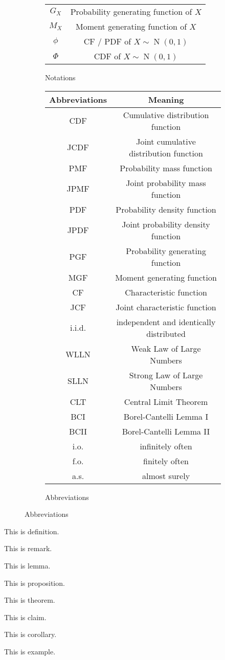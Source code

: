 \documentclass{huhtakm-template-book}
\DeclareMathOperator{\N}{N}
\begin{document}
\begin{figure}[h]
\begin{subfigure}{0.45\textwidth}
\begin{tabular}{cc}
			$G_{X}$ & Probability generating function of $X$\\
			$M_{X}$ & Moment generating function of $X$\\
			$\phi$ & CF / PDF of $X\sim\N(0,1)$\\
			$\Phi$ & CDF of $X\sim\N(0,1)$
		\end{tabular}
		\caption{Notations}
	\end{subfigure}
	\begin{subfigure}{0.45\textwidth}
		\centering
		\begin{tabular}{cc}
			Abbreviations & Meaning\\
			\hline
			CDF & Cumulative distribution function\\
			JCDF & Joint cumulative distribution function\\
			PMF & Probability mass function\\
			JPMF & Joint probability mass function\\
			PDF & Probability density function\\
			JPDF & Joint probability density function\\
			PGF & Probability generating function\\
			MGF & Moment generating function\\
			CF & Characteristic function\\
			JCF & Joint characteristic function\\
			i.i.d. & independent and identically distributed\\
			WLLN & Weak Law of Large Numbers\\
			SLLN & Strong Law of Large Numbers\\
			CLT & Central Limit Theorem\\
			BCI & Borel-Cantelli Lemma I\\
			BCII & Borel-Cantelli Lemma II\\
			i.o. & infinitely often\\
			f.o. & finitely often\\
			a.s. & almost surely
		\end{tabular}
		\caption{Abbreviations}
	\end{subfigure}
\end{figure}
\begin{defn}
	This is definition.
\end{defn}
\begin{rem}
	This is remark.
\end{rem}
\begin{lem}
	This is lemma.
\end{lem}
\begin{prop}
	This is proposition.
\end{prop}
\begin{thm}
	This is theorem.
\end{thm}
\begin{cla}
	This is claim.
\end{cla}
\begin{cor}
	This is corollary.
\end{cor}
\begin{eg}
	This is example.
\end{eg}
\tableofcontents
\end{document}
